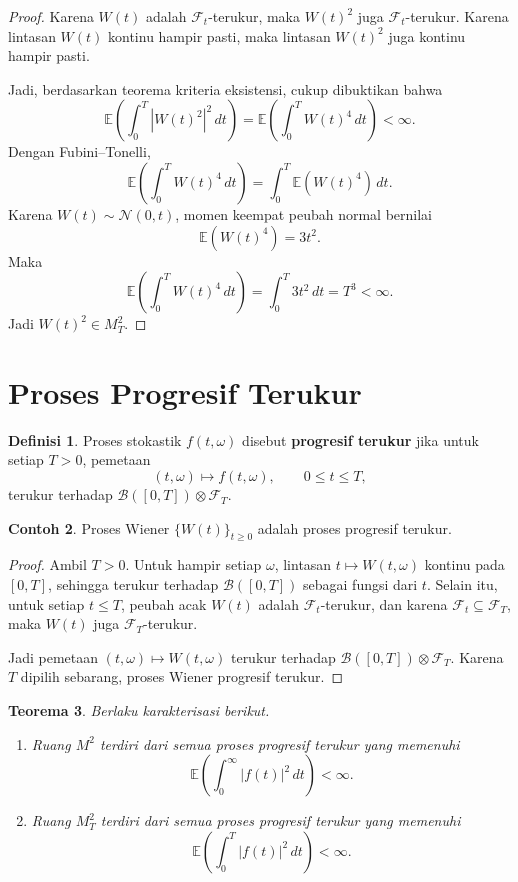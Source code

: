 \documentclass[12pt,a4paper]{article}
\theoremstyle{definition}
\newtheorem{definisi}{Definisi}[section]
\newtheorem{contoh}[definisi]{Contoh}
\theoremstyle{plain}
\newtheorem{teorema}[definisi]{Teorema}
\newcommand{\E}{\mathbb{E}}
\newcommand{\F}{\mathcal{F}}
\newcommand{\B}{\mathcal{B}}
\begin{document}
\begin{proof}
  Karena $W(t)$ adalah $\F_t$-terukur, maka $W(t)^2$ juga $\F_t$-terukur. Karena
  lintasan $W(t)$ kontinu hampir pasti, maka lintasan $W(t)^2$ juga kontinu
  hampir pasti.

  Jadi, berdasarkan teorema kriteria eksistensi, cukup dibuktikan bahwa
  \[
    \E\left(\int_0^T |W(t)^2|^2\,dt\right)
    =
    \E\left(\int_0^T W(t)^4\,dt\right)<\infty.
  \]
  Dengan Fubini--Tonelli,
  \[
    \E\left(\int_0^T W(t)^4\,dt\right)
    =
    \int_0^T \E(W(t)^4)\,dt.
  \]
  Karena $W(t)\sim\mathcal{N}(0,t)$, momen keempat peubah normal bernilai
  \[
    \E(W(t)^4)=3t^2.
  \]
  Maka
  \[
    \E\left(\int_0^T W(t)^4\,dt\right)
    =
    \int_0^T 3t^2\,dt
    =
    T^3
    <\infty.
  \]
  Jadi $W(t)^2\in M_T^2$.
\end{proof}

\section{Proses Progresif Terukur}

\begin{definisi}
  Proses stokastik $f(t,\omega)$ disebut \textbf{progresif terukur} jika untuk
  setiap $T>0$, pemetaan
  \[
    (t,\omega)\longmapsto f(t,\omega),
    \qquad 0\le t\le T,
  \]
  terukur terhadap $\B([0,T])\otimes\F_T$.
\end{definisi}

\begin{contoh}
  Proses Wiener $\{W(t)\}_{t\ge 0}$ adalah proses progresif terukur.
\end{contoh}

\begin{proof}
  Ambil $T>0$. Untuk hampir setiap $\omega$, lintasan
  $t\mapsto W(t,\omega)$ kontinu pada $[0,T]$, sehingga terukur terhadap
  $\B([0,T])$ sebagai fungsi dari $t$. Selain itu, untuk setiap $t\le T$, peubah
  acak $W(t)$ adalah $\F_t$-terukur, dan karena $\F_t\subseteq \F_T$, maka
  $W(t)$ juga $\F_T$-terukur.

  Jadi pemetaan $(t,\omega)\mapsto W(t,\omega)$ terukur terhadap
  $\B([0,T])\otimes\F_T$. Karena $T$ dipilih sebarang, proses Wiener progresif
  terukur.
\end{proof}

\begin{teorema}
  Berlaku karakterisasi berikut.
  \begin{enumerate}[label=\arabic*.]
    \item Ruang $M^2$ terdiri dari semua proses progresif terukur yang memenuhi
          \[
            \E\left(\int_0^\infty |f(t)|^2\,dt\right)<\infty.
          \]
    \item Ruang $M_T^2$ terdiri dari semua proses progresif terukur yang memenuhi
          \[
            \E\left(\int_0^T |f(t)|^2\,dt\right)<\infty.
          \]
  \end{enumerate}
\end{teorema}
\end{document}
